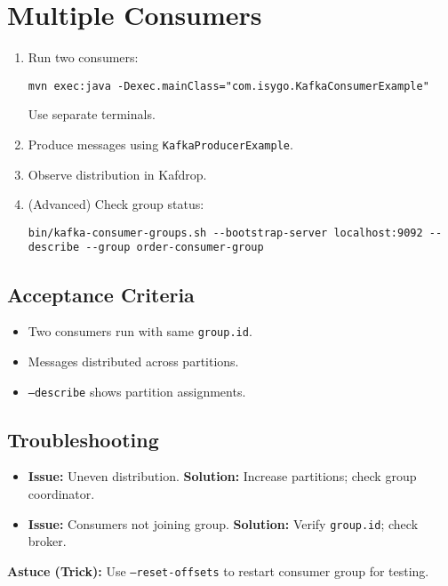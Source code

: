 \documentclass[12pt,a4paper]{report}
\begin{document}
\section{Multiple Consumers}
\begin{enumerate}
    \item Run two consumers:
    \begin{lstlisting}
mvn exec:java -Dexec.mainClass="com.isygo.KafkaConsumerExample"
    \end{lstlisting}
    Use separate terminals.
    \item Produce messages using \texttt{KafkaProducerExample}.
    \item Observe distribution in Kafdrop.
    \item (Advanced) Check group status:
    \begin{lstlisting}
bin/kafka-consumer-groups.sh --bootstrap-server localhost:9092 --describe --group order-consumer-group
    \end{lstlisting}
\end{enumerate}

\subsection{Acceptance Criteria}
\begin{itemize}
    \item Two consumers run with same \texttt{group.id}.
    \item Messages distributed across partitions.
    \item \texttt{--describe} shows partition assignments.
\end{itemize}

\subsection{Troubleshooting}
\begin{itemize}
    \item \textbf{Issue:} Uneven distribution.
      \textbf{Solution:} Increase partitions; check group coordinator.
    \item \textbf{Issue:} Consumers not joining group.
      \textbf{Solution:} Verify \texttt{group.id}; check broker.
\end{itemize}

\begin{framed}
\textbf{Astuce (Trick):} Use \texttt{--reset-offsets} to restart consumer group for testing.
\end{framed}
\end{document}
